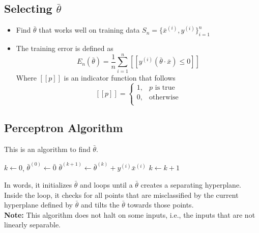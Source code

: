 \documentclass[12pt]{article}
\begin{document}
\subsection{Selecting $\bar{\theta}$}

\begin{itemize}
	\item Find $\bar{\theta}$ that works well on training data $S_n = \{ \bar{x}^{(i)}, y^{(i)} \}_{i=1}^n$
	\item The training error is defined as
		\[ E_n(\bar{\theta}) = \frac 1 n \sum_{i=1}^n [[y^{(i)}(\bar{\theta} \cdot \bar{x}) \le 0 ]] \]
		Where $[[p]]$ is an indicator function that follows
		\[ 
			[[p]] = \begin{cases}
				1, & p \text{ is true}\\
				0, & \text{otherwise}\\
			\end{cases}
		\]
\end{itemize}

\subsection{Perceptron Algorithm}

This is an algorithm to find $\bar{\theta}$.\\

\begin{algorithm} \label{alg:perceptron}
\caption{Perceptron Algorithm}
\begin{algorithmic}
\State $k \gets 0$, $\bar{\theta}^{(0)} \gets \bar{0}$
            \State $\bar{\theta}^{(k+1)} \gets \bar{\theta}^{(k)} + y^{(i)}\bar{x}^{(i)}$
						\State $k \gets k + 1$
        \EndIf
    \EndFor
\EndWhile
\end{algorithmic}
\end{algorithm}

In words, it initializes $\bar{\theta}$ and loops until a $\bar{\theta}$ creates a separating hyperplane. Inside the loop, it checks for all points that are misclassified by the current hyperplane defined by $\bar{\theta}$ and tilts the $\bar{\theta}$ towards those points. \\

\textbf{Note:} This algorithm does not halt on some inputs, i.e., the inputs that are not linearly separable.

\newpage
\end{document}
